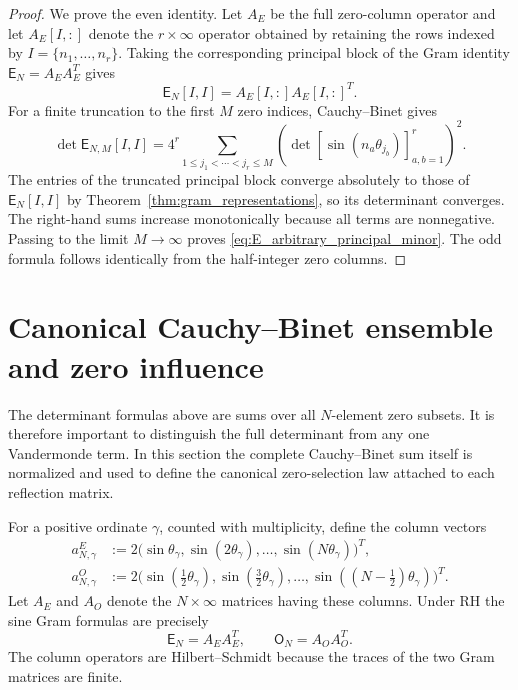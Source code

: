 \documentclass[11pt]{amsart}
\numberwithin{equation}{section}
\theoremstyle{plain}
\theoremstyle{definition}
\theoremstyle{remark}
\newcommand{\RH}{\mathrm{RH}}
\newcommand{\E}{\mathsf E}
\newcommand{\Omat}{\mathsf O}
\begin{document}
\begin{proof}
We prove the even identity.  Let $A_E$ be the full zero-column operator and let $A_E[I,:]$ denote the $r\times\infty$ operator obtained by retaining the rows indexed by $I=\{n_1,\ldots,n_r\}$.  Taking the corresponding principal block of the Gram identity $\E_N=A_EA_E^T$ gives
\begin{equation}
\E_N[I,I]=A_E[I,:]A_E[I,:]^T.
\end{equation}
For a finite truncation to the first $M$ zero indices, Cauchy--Binet gives
\begin{equation}
\det\E_{N,M}[I,I]
=4^r\sum_{1\le j_1<\cdots<j_r\le M}
\left(\det[\sin(n_a\theta_{j_b})]_{a,b=1}^r\right)^2.
\end{equation}
The entries of the truncated principal block converge absolutely to those of $\E_N[I,I]$ by Theorem~\ref{thm:gram_representations}, so its determinant converges.  The right-hand sums increase monotonically because all terms are nonnegative.  Passing to the limit $M\to\infty$ proves \eqref{eq:E_arbitrary_principal_minor}.  The odd formula follows identically from the half-integer zero columns.
\end{proof}

\section{Canonical Cauchy--Binet ensemble and zero influence}
\label{sec:zero_leverage}

The determinant formulas above are sums over all $N$-element zero subsets.  It is therefore important to distinguish the full determinant from any one Vandermonde term.  In this section the complete Cauchy--Binet sum itself is normalized and used to define the canonical zero-selection law attached to each reflection matrix.

For a positive ordinate $\gamma$, counted with multiplicity, define the column vectors
\begin{align}
a_{N,\gamma}^{E}
&:=2\bigl(\sin\theta_\gamma,\sin(2\theta_\gamma),\ldots,\sin(N\theta_\gamma)\bigr)^T,
\label{eq:E_zero_column}\\
a_{N,\gamma}^{O}
&:=2\bigl(\sin(\tfrac12\theta_\gamma),\sin(\tfrac32\theta_\gamma),\ldots,
\sin((N-\tfrac12)\theta_\gamma)\bigr)^T.
\label{eq:O_zero_column}
\end{align}
Let $A_E$ and $A_O$ denote the $N\times\infty$ matrices having these columns.  Under $\RH$ the sine Gram formulas are precisely
\begin{equation}
\E_N=A_EA_E^T,
\qquad
\Omat_N=A_OA_O^T.
\label{eq:zero_column_gram}
\end{equation}
The column operators are Hilbert--Schmidt because the traces of the two Gram matrices are finite.
\end{document}
